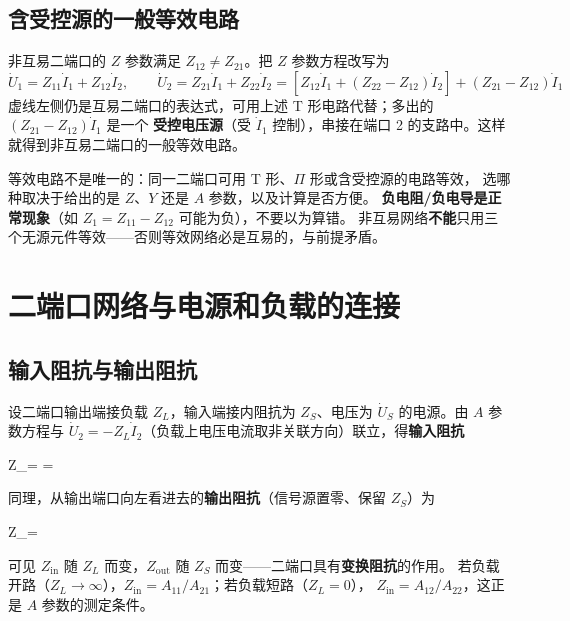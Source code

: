 \subsection{含受控源的一般等效电路}
非互易二端口的 $Z$ 参数满足 $Z_{12}\ne Z_{21}$。把 $Z$ 参数方程改写为
\begin{equation}
  \dot{U}_1=Z_{11}\dot{I}_1+Z_{12}\dot{I}_2,\qquad
  \dot{U}_2=Z_{21}\dot{I}_1+Z_{22}\dot{I}_2
  =\left[Z_{12}\dot{I}_1+(Z_{22}-Z_{12})\dot{I}_2\right]+(Z_{21}-Z_{12})\dot{I}_1
\end{equation}
虚线左侧仍是互易二端口的表达式，可用上述 T 形电路代替；多出的 $(Z_{21}-Z_{12})\dot{I}_1$ 是一个
\textbf{受控电压源}（受 $\dot{I}_1$ 控制），串接在端口 2 的支路中。这样就得到非互易二端口的一般等效电路。

\begin{corepoint}{等效电路不是唯一的：同一二端口可用 T 形、$\Pi$ 形或含受控源的电路等效，
选哪种取决于给出的是 $Z$、$Y$ 还是 $A$ 参数，以及计算是否方便。
\textbf{负电阻/负电导是正常现象}（如 $Z_1=Z_{11}-Z_{12}$ 可能为负），不要以为算错。
非互易网络\textbf{不能}只用三个无源元件等效——否则等效网络必是互易的，与前提矛盾。}
\end{corepoint}

\section{二端口网络与电源和负载的连接}

\subsection{输入阻抗与输出阻抗}
设二端口输出端接负载 $Z_L$，输入端接内阻抗为 $Z_S$、电压为 $\dot{U}_S$ 的电源。由 $A$ 参数方程与
$\dot{U}_2=-Z_L\dot{I}_2$（负载上电压电流取非关联方向）联立，得\textbf{输入阻抗}
\begin{keyformula}{Z_{}=
  =}
\end{keyformula}
同理，从输出端口向左看进去的\textbf{输出阻抗}（信号源置零、保留 $Z_S$）为
\begin{keyformula}{Z_{}=}
\end{keyformula}
可见 $Z_{\mathrm{in}}$ 随 $Z_L$ 而变，$Z_{\mathrm{out}}$ 随 $Z_S$ 而变——二端口具有\textbf{变换阻抗}的作用。
若负载开路（$Z_L\to\infty$），$Z_{\mathrm{in}}=A_{11}/A_{21}$；若负载短路（$Z_L=0$），
$Z_{\mathrm{in}}=A_{12}/A_{22}$，这正是 $A$ 参数的测定条件。

